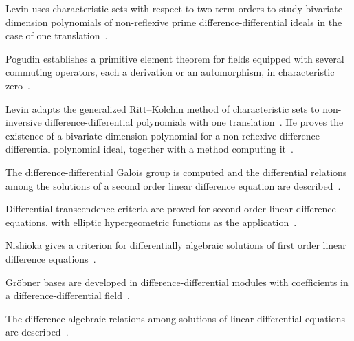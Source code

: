 Levin uses characteristic sets with respect to two term orders to study
bivariate dimension polynomials of non-reflexive prime difference-differential
ideals in the case of one
translation~\cite{WlBivariateDimensionPolynomialsO2018}.

Pogudin establishes a primitive element theorem for fields equipped with
several commuting operators, each a derivation or an automorphism, in
characteristic zero~\cite{WlAPrimitiveElementTheoremForFie2019}.

Levin adapts the generalized Ritt--Kolchin method of characteristic sets to
non-inversive difference-differential polynomials with one translation~\cite{WlBivariateKolchinTypeDimensionP2021}. He
proves the existence of a bivariate dimension polynomial for a non-reflexive
difference-differential polynomial ideal, together with a method computing
it~\cite{WlBivariateKolchinTypeDimensionP2021}.

The difference-differential Galois group is computed and the differential
relations among the solutions of a second order linear difference equation are
described~\cite{WlComputationOfTheDifferenceDiff2020}.

Differential transcendence criteria are proved for second order linear
difference equations, with elliptic hypergeometric functions as the
application~\cite{WlDifferentialTranscendenceCrite2020}.

Nishioka gives a criterion for differentially algebraic solutions of first
order linear difference equations~\cite{WlANoteOnDifferentiallyAlgebraic2020}.

Gr\"obner bases are developed in difference-differential modules with
coefficients in a difference-differential
field~\cite{WlGrBnerBasesInDifferenceDiffere2020}.

The difference algebraic relations among solutions of linear differential
equations are described~\cite{WlDifferenceAlgebraicRelationsAm2020}.
